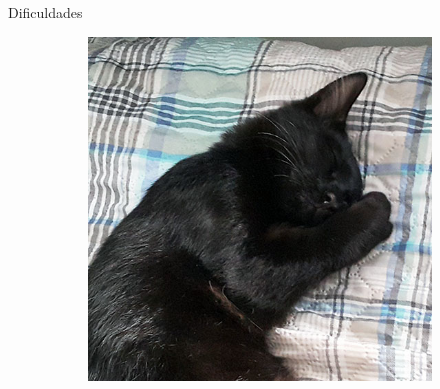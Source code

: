 \begin{frame}{Dificuldades}
\begin{overprint}
\begin{figure}
{\begin{minipage}{0.31\textwidth}
\begin{subfigure}[t]{0.5\textwidth}
    \end{subfigure}
    \begin{subfigure}[t]{0.5\textwidth}
    \centering
    \includegraphics[width=0.8\linewidth]{imagens/pose_02.jpg}
    \end{subfigure}
\end{minipage}}


\end{figure}
\end{overprint}
\end{frame}
